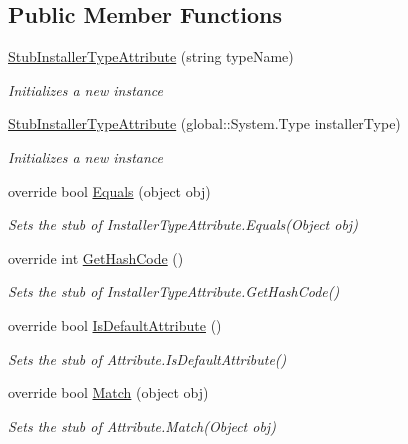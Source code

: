 \subsection*{Public Member Functions}
\begin{DoxyCompactItemize}
\item 
\hyperlink{class_system_1_1_component_model_1_1_fakes_1_1_stub_installer_type_attribute_ac11ff1e0a7774e8baea4b9f1d6316cac}{Stub\-Installer\-Type\-Attribute} (string type\-Name)
\begin{DoxyCompactList}\small\item\em Initializes a new instance\end{DoxyCompactList}\item 
\hyperlink{class_system_1_1_component_model_1_1_fakes_1_1_stub_installer_type_attribute_af9c7a2de24080040a13ed9b09d005688}{Stub\-Installer\-Type\-Attribute} (global\-::\-System.\-Type installer\-Type)
\begin{DoxyCompactList}\small\item\em Initializes a new instance\end{DoxyCompactList}\item 
override bool \hyperlink{class_system_1_1_component_model_1_1_fakes_1_1_stub_installer_type_attribute_a65ca01ebac0192a115d8fce9072d49df}{Equals} (object obj)
\begin{DoxyCompactList}\small\item\em Sets the stub of Installer\-Type\-Attribute.\-Equals(\-Object obj)\end{DoxyCompactList}\item 
override int \hyperlink{class_system_1_1_component_model_1_1_fakes_1_1_stub_installer_type_attribute_a613c967735572522a952917a8a37a0d8}{Get\-Hash\-Code} ()
\begin{DoxyCompactList}\small\item\em Sets the stub of Installer\-Type\-Attribute.\-Get\-Hash\-Code()\end{DoxyCompactList}\item 
override bool \hyperlink{class_system_1_1_component_model_1_1_fakes_1_1_stub_installer_type_attribute_a36445968030293806aaedf49282e46bf}{Is\-Default\-Attribute} ()
\begin{DoxyCompactList}\small\item\em Sets the stub of Attribute.\-Is\-Default\-Attribute()\end{DoxyCompactList}\item 
override bool \hyperlink{class_system_1_1_component_model_1_1_fakes_1_1_stub_installer_type_attribute_a0152d2c97dc60c0d9dca7e3f5ea48fc9}{Match} (object obj)
\begin{DoxyCompactList}\small\item\em Sets the stub of Attribute.\-Match(\-Object obj)\end{DoxyCompactList}\end{DoxyCompactItemize}
